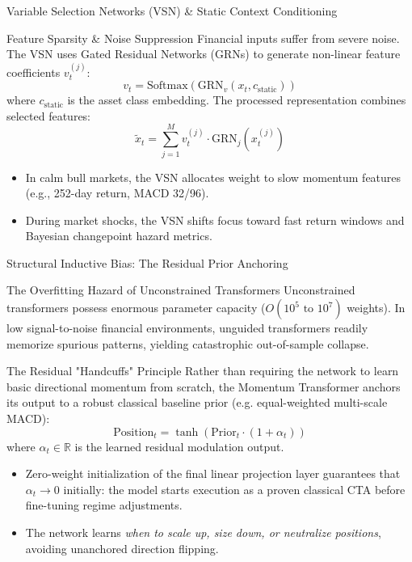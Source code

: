 \documentclass[10pt]{beamer}
\begin{document}
\begin{frame}{Variable Selection Networks (VSN) \& Static Context Conditioning}
  \begin{block}{Feature Sparsity \& Noise Suppression}
    Financial inputs suffer from severe noise. The VSN uses Gated Residual Networks (GRNs) to generate non-linear feature coefficients $v_t^{(j)}$:
    \begin{equation*}
      v_t = \text{Softmax}\left(\text{GRN}_v(x_t, c_{\text{static}})\right)
    \end{equation*}
    where $c_{\text{static}}$ is the asset class embedding. The processed representation combines selected features:
    \begin{equation*}
      \tilde{x}_t = \sum_{j=1}^M v_t^{(j)} \cdot \text{GRN}_j\left(x_t^{(j)}\right)
    \end{equation*}
  \end{block}
  \begin{itemize}\scriptsize
    \item In calm bull markets, the VSN allocates weight to slow momentum features (e.g., 252-day return, MACD 32/96).
    \item During market shocks, the VSN shifts focus toward fast return windows and Bayesian changepoint hazard metrics.
  \end{itemize}
\end{frame}

\begin{frame}{Structural Inductive Bias: The Residual Prior Anchoring}
  \begin{alertblock}{The Overfitting Hazard of Unconstrained Transformers}
    Unconstrained transformers possess enormous parameter capacity ($O(10^5 \text{ to } 10^7)$ weights). In low signal-to-noise financial environments, unguided transformers readily memorize spurious patterns, yielding catastrophic out-of-sample collapse.
  \end{alertblock}
  \begin{block}{The Residual "Handcuffs" Principle}
    Rather than requiring the network to learn basic directional momentum from scratch, the Momentum Transformer anchors its output to a robust classical baseline prior (e.g. equal-weighted multi-scale MACD):
    \begin{equation*}
      \text{Position}_t = \tanh\left(\text{Prior}_t \cdot (1 + \alpha_t)\right)
    \end{equation*}
    where $\alpha_t \in \mathbb{R}$ is the learned residual modulation output.
  \end{block}
  \begin{itemize}\scriptsize
    \item Zero-weight initialization of the final linear projection layer guarantees that $\alpha_t \to 0$ initially: the model starts execution as a proven classical CTA before fine-tuning regime adjustments.
    \item The network learns \emph{when to scale up, size down, or neutralize positions}, avoiding unanchored direction flipping.
  \end{itemize}
\end{frame}
\end{document}
